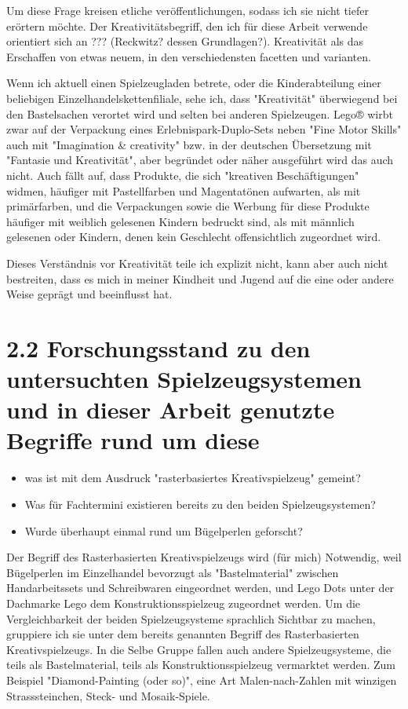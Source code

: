 \documentclass[11pt,a4paper,twoside]{scrreprt}
\begin{document}
Um diese Frage kreisen etliche veröffentlichungen, sodass ich sie nicht tiefer erörtern möchte. 
Der Kreativitätsbegriff, den ich für diese Arbeit verwende orientiert sich an ??? (Reckwitz? dessen Grundlagen?).
Kreativität als das Erschaffen von etwas neuem, in den verschiedensten facetten und varianten.


Wenn ich aktuell einen Spielzeugladen betrete, oder die Kinderabteilung einer beliebigen Einzelhandelskettenfiliale, sehe ich, dass "Kreativität" überwiegend bei den Bastelsachen verortet wird und selten bei anderen Spielzeugen. Lego® wirbt zwar auf der Verpackung eines Erlebnispark-Duplo-Sets neben "Fine Motor Skills" auch mit "Imagination \& creativity" bzw. in der deutschen Übersetzung mit "Fantasie und Kreativität", aber begründet oder näher ausgeführt wird das auch nicht.
Auch fällt auf, dass Produkte, die sich "kreativen Beschäftigungen" widmen, häufiger mit Pastellfarben und Magentatönen aufwarten, als mit primärfarben, und die Verpackungen sowie die Werbung für diese Produkte häufiger mit weiblich gelesenen Kindern bedruckt sind, als mit männlich gelesenen oder Kindern, denen kein Geschlecht offensichtlich zugeordnet wird.

Dieses Verständnis vor Kreativität teile ich explizit nicht, kann aber auch nicht bestreiten, dass es mich in meiner Kindheit und Jugend auf die eine oder andere Weise geprägt und beeinflusst hat.
	
	\section{2.2 Forschungsstand zu den untersuchten Spielzeugsystemen und in dieser Arbeit genutzte Begriffe rund um diese}
		\begin{itemize}
			\item was ist mit dem Ausdruck "rasterbasiertes Kreativspielzeug" gemeint?
			\item Was für Fachtermini existieren bereits zu den beiden Spielzeugsystemen?
			\item Wurde überhaupt einmal rund um Bügelperlen geforscht?
		\end{itemize}

Der Begriff des Rasterbasierten Kreativspielzeugs wird (für mich) Notwendig, weil Bügelperlen im Einzelhandel bevorzugt als "Bastelmaterial" zwischen Handarbeitssets und Schreibwaren eingeordnet werden, und Lego Dots unter der Dachmarke Lego dem Konstruktionsspielzeug zugeordnet werden. Um die Vergleichbarkeit der beiden Spielzeugsysteme sprachlich Sichtbar zu machen, gruppiere ich sie unter dem bereits genannten Begriff des Rasterbasierten Kreativspielzeugs. In die Selbe Gruppe fallen auch andere Spielzeugsysteme, die teils als Bastelmaterial, teils als Konstruktionsspielzeug vermarktet werden. Zum Beispiel "Diamond-Painting (oder so)", eine Art Malen-nach-Zahlen mit winzigen Strasssteinchen, Steck- und Mosaik-Spiele.
\end{document}
